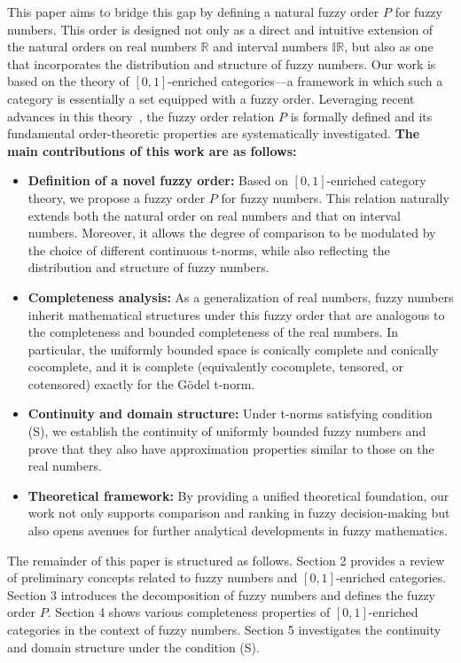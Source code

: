 \documentclass[preprint,3p,times]{elsarticle}
\theoremstyle{plain}
\theoremstyle{definition}
\numberwithin{equation}{section}
\begin{document}
This paper aims to bridge this gap by defining a natural fuzzy order \(P\) for fuzzy numbers.  This order is designed not only as a direct and intuitive extension of the natural orders on real numbers \(\mathbb{R}\) and interval numbers \(\mathbb{IR}\), but also as one that incorporates the distribution and structure of fuzzy numbers. Our work is based on the theory of $[0,1]$-enriched categories---a framework in which such a category is essentially a set equipped with a fuzzy order. Leveraging recent advances in this theory~\cite{Zhang2024IntroductoryNO}, the fuzzy order relation \(P\) is formally defined and its fundamental order-theoretic properties are systematically investigated. \textbf{The main contributions of this work are as follows:}
\begin{itemize}
	\item \textbf{Definition of a novel fuzzy order:} Based on \([0,1]\)-enriched category theory, we propose a fuzzy order \(P\) for fuzzy numbers. This relation naturally extends both the natural order on real numbers and that on interval numbers. Moreover, it allows the degree of comparison to be modulated by the choice of different continuous t-norms, while also reflecting the distribution and structure of fuzzy numbers.
	\item \textbf{Completeness analysis:} As a generalization of real numbers, fuzzy numbers inherit mathematical structures under this fuzzy order that are analogous to the completeness and bounded completeness of the real numbers. In particular, the uniformly bounded space is conically complete and conically cocomplete, and it is complete (equivalently cocomplete, tensored, or cotensored) exactly for the Gödel t-norm.

	\item \textbf{Continuity and domain structure:} Under t-norms satisfying condition (S), we establish the continuity of uniformly bounded fuzzy numbers and prove that they also have approximation properties similar to those on the real numbers.
	\item \textbf{Theoretical framework:} By providing a unified theoretical foundation, our work not only supports comparison and ranking in fuzzy decision-making but also opens avenues for further analytical developments in fuzzy mathematics.
\end{itemize}

The remainder of this paper is structured as follows. Section 2 provides a review of preliminary concepts related to fuzzy numbers and $[0,1]$-enriched categories. Section 3 introduces the decomposition of fuzzy numbers and defines the fuzzy order $P$. Section 4 shows various completeness properties of \([0,1]\)-enriched categories in the context of fuzzy numbers. Section 5 investigates the continuity and domain structure under the condition (S).
\end{document}
